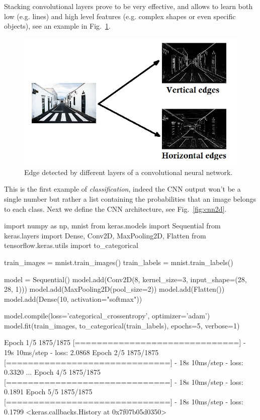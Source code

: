 Stacking convolutional layers prove to be very effective, and allows to learn both low (e.g. lines) and high level features (e.g. complex shapes or even specific objects), see an example in Fig.~\ref{fig:conv_filters}.

\begin{figure}[htb]
\centering
\includegraphics[width=1.\textwidth]{figures/edges.jpg}
\caption{Edge detected by different layers of a convolutional neural network.}
\label{fig:conv_filters}
\end{figure}

This is the first example of \emph{classification}, indeed the CNN output won't be a single number but rather a list containing the probabilities that an image belongs to each class. Next we define the CNN architecture, see Fig.~\ref{fig:cnn2d}.

\begin{ipython}
import numpy as np, mnist
from keras.models import Sequential
from keras.layers import Dense, Conv2D, MaxPooling2D, Flatten
from tensorflow.keras.utils import to_categorical

train_images = mnist.train_images() 
train_labels = mnist.train_labels() 

model = Sequential()
model.add(Conv2D(8, kernel_size=3, input_shape=(28, 28, 1)))
model.add(MaxPooling2D(pool_size=2))
model.add(Flatten())
model.add(Dense(10, activation="softmax"))

model.compile(loss='categorical_crossentropy', optimizer='adam')
model.fit(train_images, to_categorical(train_labels), epochs=5, verbose=1)
\end{ipython}
\begin{ioutput}
Epoch 1/5
1875/1875 [==============================] - 19s 10ms/step - loss: 2.0868
Epoch 2/5
1875/1875 [==============================] - 18s 10ms/step - loss: 0.3320
...
Epoch 4/5
1875/1875 [==============================] - 18s 10ms/step - loss: 0.1891
Epoch 5/5
1875/1875 [==============================] - 18s 10ms/step - loss: 0.1799
<keras.callbacks.History at 0x7f07b05d0350>
\end{ioutput}

